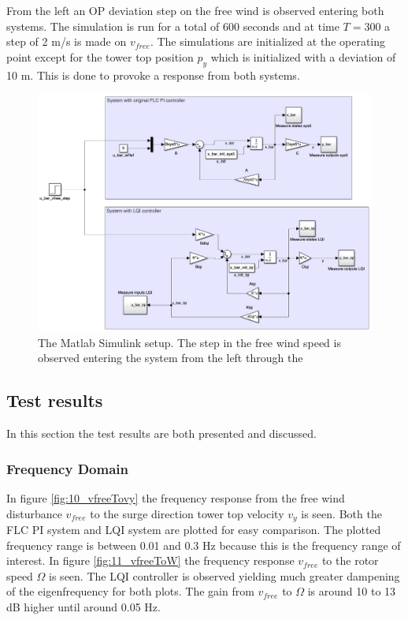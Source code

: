 From the left an OP deviation step on the free wind is observed entering both systems. The simulation is run for a total of 600 seconds and at time $ T = 300 $ a step of 2 m/s is made on $ v_{free} $. The simulations are initialized at the operating point except for the tower top position $ p_y $ which is initialized with a deviation of 10 m. This is done to provoke a response from both systems.
\begin{figure}[ht]
	\centering
	\includegraphics[width=0.95\linewidth]{Graphics/TestResults/linearModPerf/simulink_setup.png}
	\caption{The Matlab Simulink setup. The step in the free wind speed is observed entering the system from the left through the }
	\label{fig:simulink_setup}
\end{figure}


\subsection{Test results}
In this section the test results are both presented and discussed.

\subsubsection{Frequency Domain}
In figure \cref{fig:10_vfreeTovy} the frequency response from the free wind disturbance $ v_{free} $ to the surge direction tower top velocity $ v_y $ is seen. Both the FLC PI system and LQI system are plotted for easy comparison. The plotted frequency range is between 0.01 and 0.3 Hz because this is the frequency range of interest. In figure \cref{fig:11_vfreeToW} the frequency response $ v_{free} $ to the rotor speed $ \Omega $ is seen. The LQI controller is observed yielding much greater dampening of the eigenfrequency for both plots. The gain from $ v_{free} $ to $ \Omega $ is around 10 to 13 dB higher until around 0.05 Hz. 

